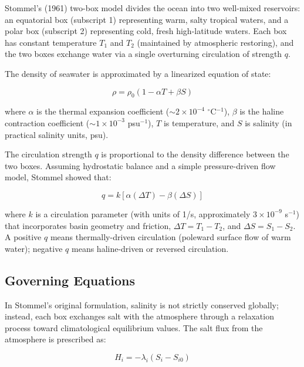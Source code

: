 \documentclass[12pt,letterpaper]{article}
\begin{document}
Stommel's (1961) two-box model divides the ocean into two well-mixed reservoirs: an equatorial box (subscript 1) representing warm, salty tropical waters, and a polar box (subscript 2) representing cold, fresh high-latitude waters. Each box has constant temperature $T_1$ and $T_2$ (maintained by atmospheric restoring), and the two boxes exchange water via a single overturning circulation of strength $q$.

The density of seawater is approximated by a linearized equation of state:

\begin{equation}
\rho = \rho_0 \left( 1 - \alpha T + \beta S \right)
\end{equation}

where $\alpha$ is the thermal expansion coefficient ($\sim 2 \times 10^{-4}$ $^\circ$C$^{-1}$), $\beta$ is the haline contraction coefficient ($\sim 1 \times 10^{-3}$ psu$^{-1}$), $T$ is temperature, and $S$ is salinity (in practical salinity units, psu).

The circulation strength $q$ is proportional to the density difference between the two boxes. Assuming hydrostatic balance and a simple pressure-driven flow model, Stommel showed that:

\begin{equation}
q = k \left[ \alpha(\Delta T) - \beta(\Delta S) \right]
\end{equation}

where $k$ is a circulation parameter (with units of 1/s, approximately $3 \times 10^{-9}$ s$^{-1}$) that incorporates basin geometry and friction, $\Delta T = T_1 - T_2$, and $\Delta S = S_1 - S_2$. A positive $q$ means thermally-driven circulation (poleward surface flow of warm water); negative $q$ means haline-driven or reversed circulation.

\subsection{Governing Equations}

In Stommel's original formulation, salinity is not strictly conserved globally; instead, each box exchanges salt with the atmosphere through a relaxation process toward climatological equilibrium values. The salt flux from the atmosphere is prescribed as:

\begin{equation}
H_i = -\lambda_i(S_i - S_{i0})
\end{equation}
\end{document}
